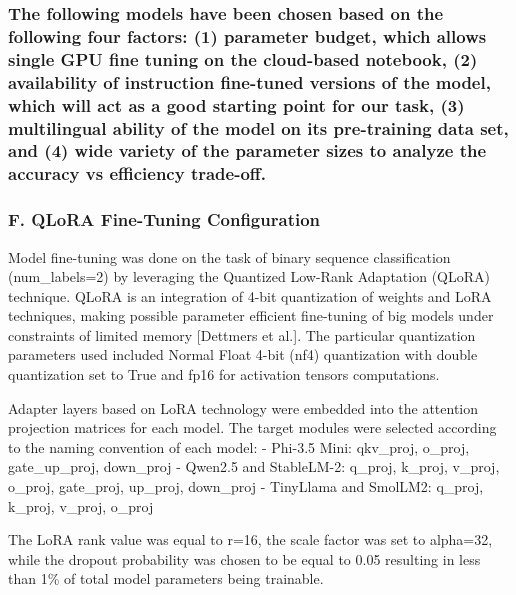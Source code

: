 \subsubsection{The following models have been chosen based on the
following four factors: (1) parameter budget, which allows single GPU
fine tuning on the cloud-based notebook, (2) availability of instruction
fine-tuned versions of the model, which will act as a good starting
point for our task, (3) multilingual ability of the model on its
pre-training data set, and (4) wide variety of the parameter sizes to
analyze the accuracy vs efficiency
trade-off.}\label{the-following-models-have-been-chosen-based-on-the-following-four-factors-1-parameter-budget-which-allows-single-gpu-fine-tuning-on-the-cloud-based-notebook-2-availability-of-instruction-fine-tuned-versions-of-the-model-which-will-act-as-a-good-starting-point-for-our-task-3-multilingual-ability-of-the-model-on-its-pre-training-data-set-and-4-wide-variety-of-the-parameter-sizes-to-analyze-the-accuracy-vs-efficiency-trade-off.}

\subsubsection{F. QLoRA Fine-Tuning
Configuration}\label{f.-qlora-fine-tuning-configuration}

Model fine-tuning was done on the task of binary sequence classification
(num\_labels=2) by leveraging the Quantized Low-Rank Adaptation (QLoRA)
technique. QLoRA is an integration of 4-bit quantization of weights and
LoRA techniques, making possible parameter efficient fine-tuning of big
models under constraints of limited memory {[}Dettmers et al.{]}. The
particular quantization parameters used included Normal Float 4-bit
(nf4) quantization with double quantization set to True and fp16 for
activation tensors computations.

Adapter layers based on LoRA technology were embedded into the attention
projection matrices for each model. The target modules were selected
according to the naming convention of each model: - Phi-3.5 Mini:
qkv\_proj, o\_proj, gate\_up\_proj, down\_proj - Qwen2.5 and StableLM-2:
q\_proj, k\_proj, v\_proj, o\_proj, gate\_proj, up\_proj, down\_proj -
TinyLlama and SmolLM2: q\_proj, k\_proj, v\_proj, o\_proj

The LoRA rank value was equal to r=16, the scale factor was set to
alpha=32, while the dropout probability was chosen to be equal to 0.05
resulting in less than 1\% of total model parameters being trainable.

